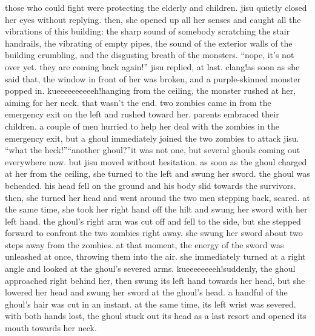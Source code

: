  those who could fight were protecting the elderly and children.
jisu quietly closed her eyes without replying.
 then, she opened up all her senses and caught all the vibrations of this building: the sharp sound of somebody scratching the stair handrails, the vibrating of empty pipes, the sound of the exterior walls of the building crumbling, and the disgusting breath of the monsters.
“nope, it’s not over yet.
 they are coming back again!” jisu replied, at last.
clang!as soon as she said that, the window in front of her was broken, and a purple-skinned monster popped in.
kueeeeeeeeeeh!hanging from the ceiling, the monster rushed at her, aiming for her neck.
 that wasn’t the end.
 two zombies came in from the emergency exit on the left and rushed toward her.
parents embraced their children.
 a couple of men hurried to help her deal with the zombies in the emergency exit, but a ghoul immediately joined the two zombies to attack jisu.
“what the heck!”“another ghoul?”it was not one, but several ghouls coming out everywhere now.
but jisu moved without hesitation.
 as soon as the ghoul charged at her from the ceiling, she turned to the left and swung her sword.
 the ghoul was beheaded.
 his head fell on the ground and his body slid towards the survivors.
then, she turned her head and went around the two men stepping back, scared.
 at the same time, she took her right hand off the hilt and swung her sword with her left hand.
the ghoul’s right arm was cut off and fell to the side, but she stepped forward to confront the two zombies right away.
she swung her sword about two steps away from the zombies.
 at that moment, the energy of the sword was unleashed at once, throwing them into the air.
 she immediately turned at a right angle and looked at the ghoul’s severed arms.
kueeeeeeeeh!suddenly, the ghoul approached right behind her, then swung its left hand towards her head, but she lowered her head and swung her sword at the ghoul’s head.
a handful of the ghoul’s hair was cut in an instant.
at the same time, its left wrist was severed.
 with both hands lost, the ghoul stuck out its head as a last resort and opened its mouth towards her neck.

